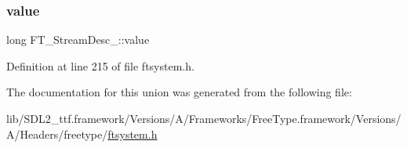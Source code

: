 \subsubsection{\texorpdfstring{value}{value}}
{\footnotesize\ttfamily long F\+T\+\_\+\+Stream\+Desc\+\_\+\+::value}



Definition at line 215 of file ftsystem.\+h.



The documentation for this union was generated from the following file\+:\begin{DoxyCompactItemize}
\item 
lib/\+S\+D\+L2\+\_\+ttf.\+framework/\+Versions/\+A/\+Frameworks/\+Free\+Type.\+framework/\+Versions/\+A/\+Headers/freetype/\mbox{\hyperlink{ftsystem_8h}{ftsystem.\+h}}\end{DoxyCompactItemize}
